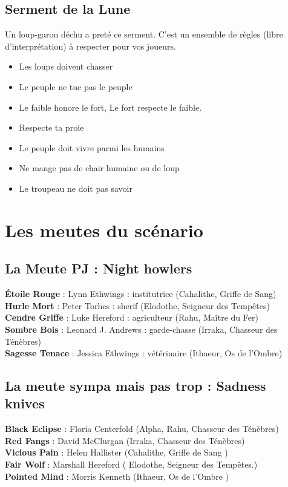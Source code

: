 \documentclass[oneside,12pt]{book}
\newcommand{\Lynn}{\textbf{Étoile Rouge} }
\newcommand{\Jessica}{\textbf{Sagesse Tenace} }
\newcommand{\Luke}{\textbf{Cendre Griffe} }
\newcommand{\Peter}{\textbf{Hurle Mort} }
\newcommand{\Leonard}{\textbf{Sombre Bois} }
\newcommand{\BlackEclipse}{\textbf{Black Eclipse} }
\begin{document}
\begin{flushleft}
\subsection{Serment de la Lune}
Un loup-garou déchu a preté ce serment. C'est un ensemble de règles (libre d'interprétation) à respecter pour vos joueurs.
\begin{itemize}
\item Les loups doivent chasser
\item Le peuple ne tue pas le peuple
\item Le faible honore le fort, Le fort respecte le faible.
\item Respecte ta proie
\item Le peuple doit vivre parmi les humains
\item Ne mange pas de chair humaine ou de loup
\item Le troupeau ne doit pas savoir
\end{itemize}

  
\clearpage
\section{Les meutes du scénario}
\subsection{La Meute PJ : Night howlers}
\Lynn : Lynn Ethwings :  institutrice (Cahalithe, Griffe de Sang) \\
\Peter : Peter Torhes : sherif (Elodothe, Seigneur des Tempêtes) \\
\Luke : Luke Hereford : agriculteur (Rahu, Maître du Fer)\\
\Leonard : Leonard J. Andrews : garde-chasse (Irraka, Chasseur des Ténèbres)\\
\Jessica : Jessica  Ethwings : vétérinaire (Ithaeur, Os de l'Ombre)\\

\subsection{La meute sympa mais pas trop : Sadness knives}
\label{sadnessknives}
\textbf{\BlackEclipse} : Floria Centerfold (Alpha, Rahu, Chasseur des Ténèbres)\\
\textbf{Red Fangs} : David McClurgan  (Irraka, Chasseur des Ténèbres)\\
\textbf{Vicious Pain} : Helen Hallister (Cahalithe, Griffe de Sang )\\
\textbf{Fair Wolf} :   Marshall Hereford ( Elodothe, Seigneur des Tempêtes.)\\
\textbf{Pointed Mind} : Morris Kenneth (Ithaeur, Os de l'Ombre )\\


\end{flushleft}
\end{document}

